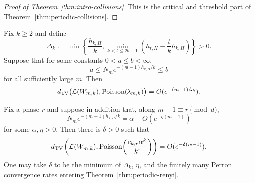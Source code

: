 \begin{proof}[Proof of Theorem~\ref{thm:intro-collisions}]
This is the critical and threshold part of
Theorem~\ref{thm:periodic-collisions}.
\end{proof}

\begin{proposition}
\label{prop:critical-tv-rate}
Fix \(k\geq2\) and define
\begin{equation}
  \Delta_k
  :=\min\left\{
    \frac{h_{k,H}}{k},
    \min_{k<t\leq2k-1}
      \left(h_{t,H}-\frac{t}{k}h_{k,H}\right)
  \right\}>0.
  \label{eq:critical-gap}
\end{equation}
Suppose that for some constants \(0<a\leq b<\infty\),
\begin{equation}
  a\leq N_m e^{-(m-1)h_{k,H}/k}\leq b
  \label{eq:critical-window}
\end{equation}
for all sufficiently large \(m\).  Then
\begin{equation}
  d_{\rm TV}\bigl(\mathcal L(W_{m,k}),
    \operatorname{Poisson}(\lambda_{m,k})\bigr)
  =O(e^{-(m-1)\Delta_k}).
  \label{eq:critical-tv-rate}
\end{equation}

Fix a phase \(r\) and suppose in addition that, along
\(m-1\equiv r\pmod d\),
\[
  N_m e^{-(m-1)h_{k,H}/k}
  =\alpha+O(e^{-\eta(m-1)})
\]
for some \(\alpha,\eta>0\).  Then there is \(\delta>0\) such that
\begin{equation}
  d_{\rm TV}\left(
    \mathcal L(W_{m,k}),
    \operatorname{Poisson}\!\left(\frac{c_{k,r}\alpha^k}{k!}\right)
  \right)
  =O(e^{-\delta(m-1)}).
  \label{eq:critical-target-rate}
\end{equation}
One may take \(\delta\) to be the minimum of \(\Delta_k\), \(\eta\),
and the finitely many Perron convergence rates entering
Theorem~\ref{thm:periodic-renyi}.
\end{proposition}

